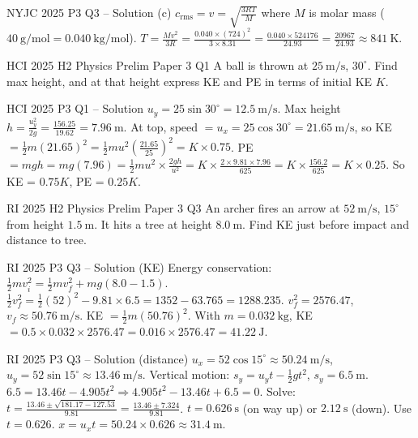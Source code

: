 \documentclass[11pt]{beamer}
\begin{document}
\begin{frame}{NYJC 2025 P3 Q3 – Solution (c)}
$c_{\text{rms}} = v = \sqrt{\frac{3RT}{M}}$ where $M$ is molar mass ($40\ \mathrm{g/mol} = 0.040\ \mathrm{kg/mol}$).
$T = \frac{M v^2}{3R} = \frac{0.040\times(724)^2}{3\times8.31} = \frac{0.040\times524176}{24.93} = \frac{20967}{24.93} \approx 841\ \mathrm{K}$.
\end{frame}

\begin{frame}[shrink=15]{HCI 2025 H2 Physics Prelim Paper 3 Q1}
A ball is thrown at $25\ \mathrm{m/s}$, $30^\circ$. Find max height, and at that height express KE and PE in terms of initial KE $K$.
\end{frame}

\begin{frame}{HCI 2025 P3 Q1 – Solution}
$u_y = 25\sin30^\circ = 12.5\ \mathrm{m/s}$. Max height $h = \frac{u_y^2}{2g} = \frac{156.25}{19.62} = 7.96\ \mathrm{m}$.
At top, speed $= u_x = 25\cos30^\circ = 21.65\ \mathrm{m/s}$, so KE $= \frac12 m (21.65)^2 = \frac12 m u^2 \left(\frac{21.65}{25}\right)^2 = K \times 0.75$.
PE $= mgh = mg(7.96) = \frac12 m u^2 \times \frac{2gh}{u^2} = K \times \frac{2\times9.81\times7.96}{625} = K \times \frac{156.2}{625} = K \times 0.25$.
So KE = $0.75K$, PE = $0.25K$.
\end{frame}

\begin{frame}[shrink=15]{RI 2025 H2 Physics Prelim Paper 3 Q3}
An archer fires an arrow at $52\ \mathrm{m/s}$, $15^\circ$ from height $1.5\ \mathrm{m}$. It hits a tree at height $8.0\ \mathrm{m}$. Find KE just before impact and distance to tree.
\end{frame}

\begin{frame}{RI 2025 P3 Q3 – Solution (KE)}
Energy conservation: $\frac12 m v_i^2 = \frac12 m v_f^2 + mg(8.0-1.5)$.
$\frac12 v_f^2 = \frac12 (52)^2 - 9.81\times6.5 = 1352 - 63.765 = 1288.235$.
$v_f^2 = 2576.47$, $v_f \approx 50.76\ \mathrm{m/s}$.
KE $= \frac12 m (50.76)^2$. With $m=0.032\ \mathrm{kg}$, KE $= 0.5\times0.032\times2576.47 = 0.016\times2576.47 = 41.22\ \mathrm{J}$.
\end{frame}

\begin{frame}{RI 2025 P3 Q3 – Solution (distance)}
$u_x = 52\cos15^\circ \approx 50.24\ \mathrm{m/s}$, $u_y = 52\sin15^\circ \approx 13.46\ \mathrm{m/s}$.
Vertical motion: $s_y = u_y t - \frac12 g t^2$, $s_y = 6.5\ \mathrm{m}$.
$6.5 = 13.46 t - 4.905 t^2 \Rightarrow 4.905 t^2 - 13.46 t + 6.5 = 0$.
Solve: $t = \frac{13.46 \pm \sqrt{181.17 - 127.53}}{9.81} = \frac{13.46 \pm 7.324}{9.81}$.
$t = 0.626\ \mathrm{s}$ (on way up) or $2.12\ \mathrm{s}$ (down). Use $t=0.626$.
$x = u_x t = 50.24\times0.626 \approx 31.4\ \mathrm{m}$.
\end{frame}
\end{document}

